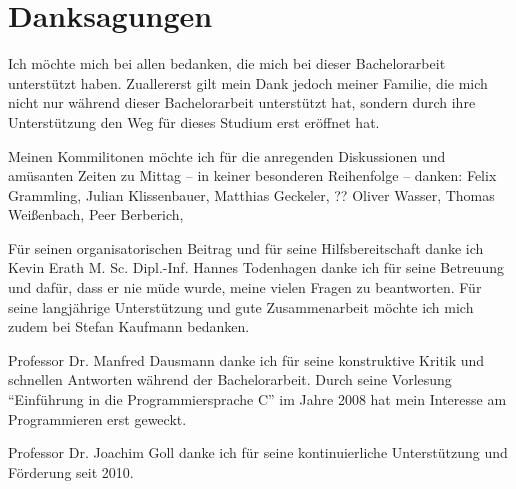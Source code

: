 
\chapter*{Danksagungen}

Ich möchte mich bei allen bedanken, die mich bei dieser Bachelorarbeit unterstützt haben.
Zuallererst gilt mein Dank jedoch meiner Familie, die mich nicht nur während dieser Bachelorarbeit unterstützt hat, sondern durch ihre Unterstützung den Weg für dieses Studium erst eröffnet hat.

Meinen Kommilitonen möchte ich für die anregenden Diskussionen und amüsanten Zeiten zu Mittag -- in keiner besonderen Reihenfolge -- danken:
Felix Grammling,
Julian Klissenbauer,
Matthias Geckeler,
?? Oliver Wasser,
Thomas Weißenbach,
Peer Berberich,



Für seinen organisatorischen Beitrag und für seine Hilfsbereitschaft danke ich Kevin Erath M. Sc.
Dipl.-Inf. Hannes Todenhagen danke ich für seine Betreuung und dafür, dass er nie müde wurde, meine vielen Fragen zu beantworten.%
Für seine langjährige Unterstützung und gute Zusammenarbeit möchte ich mich zudem bei  Stefan Kaufmann bedanken.

Professor Dr. Manfred Dausmann danke ich für seine konstruktive Kritik und schnellen Antworten während der Bachelorarbeit. Durch seine Vorlesung \enquote{Einführung in die Programmiersprache C} im Jahre 2008 hat mein Interesse am Programmieren erst geweckt.

Professor Dr. Joachim Goll danke ich für seine kontinuierliche Unterstützung und Förderung seit 2010.
